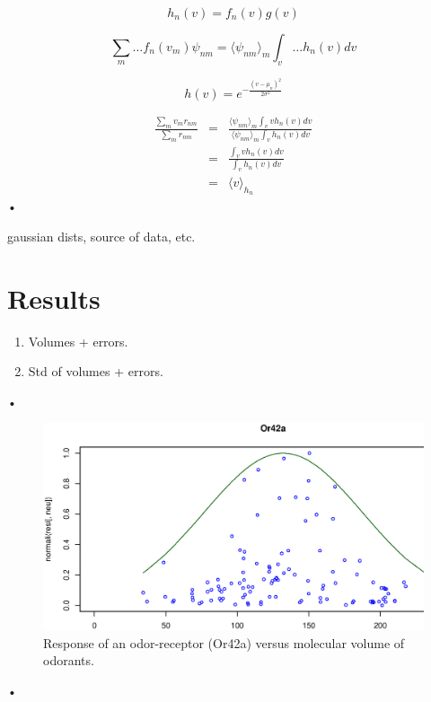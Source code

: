 \documentclass[11pt]{paper} %
\begin{document}
\[
h_n(v) = f_n(v) g(v)
\]


\[
\sum_m \dots f_n(v_m) \psi_{nm} = \langle \psi_{nm} \rangle_m \int_v \dots h_n(v) dv 
\]



\[
\displaystyle h(v) = e^{-\frac{(v-\mu_n)^2}{2\sigma^2}}
\]


\begin{eqnarray}
\frac{\sum_m v_m r_{nm}}{\sum_m r_{nm}} &=& \frac{\langle \psi_{nm} \rangle_m \int_v v h_n(v) dv }{\langle \psi_{nm} \rangle_m \int_v  h_n(v) dv }\\
 &=& \frac{\int_v v h_n(v) dv}{ \int_v  h_n(v) dv } \\
 &=& \langle v \rangle_{h_n}
\end{eqnarray}•


gaussian dists, source of data, etc.

\section{Results}

\begin{enumerate}
\item Volumes + errors.
\item Std of volumes + errors.
\end{enumerate}•

\begin{figure}
\includegraphics[width=\textwidth]{fig/vol-res-Or42a}
\caption{Response of an odor-receptor (Or42a) versus molecular volume of odorants.}
\end{figure}•
\end{document}
